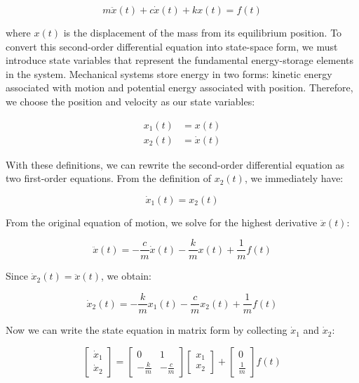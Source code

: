 \begin{equation}
m\ddot{x}(t) + c\dot{x}(t) + kx(t) = f(t)
\end{equation}

where $x(t)$ is the displacement of the mass from its equilibrium position. To convert this second-order differential equation into state-space form, we must introduce state variables that represent the fundamental energy-storage elements in the system. Mechanical systems store energy in two forms: kinetic energy associated with motion and potential energy associated with position. Therefore, we choose the position and velocity as our state variables:

\begin{subequations}
\begin{align}
x_1(t) &= x(t) \\
x_2(t) &= \dot{x}(t)
\end{align}
\end{subequations}

With these definitions, we can rewrite the second-order differential equation as two first-order equations. From the definition of $x_2(t)$, we immediately have:

\begin{equation}
\dot{x}_1(t) = x_2(t)
\end{equation}

From the original equation of motion, we solve for the highest derivative $\ddot{x}(t)$:

\begin{equation}
\ddot{x}(t) = -\frac{c}{m}\dot{x}(t) - \frac{k}{m}x(t) + \frac{1}{m}f(t)
\end{equation}

Since $\dot{x}_2(t) = \ddot{x}(t)$, we obtain:

\begin{equation}
\dot{x}_2(t) = -\frac{k}{m}x_1(t) - \frac{c}{m}x_2(t) + \frac{1}{m}f(t)
\end{equation}

Now we can write the state equation in matrix form by collecting $\dot{x}_1$ and $\dot{x}_2$:

\begin{equation}
\begin{bmatrix}
\dot{x}_1 \\
\dot{x}_2
\end{bmatrix}
=
\begin{bmatrix}
0 & 1 \\
-\frac{k}{m} & -\frac{c}{m}
\end{bmatrix}
\begin{bmatrix}
x_1 \\
x_2
\end{bmatrix}
+
\begin{bmatrix}
0 \\
\frac{1}{m}
\end{bmatrix}
f(t)
\end{equation}

